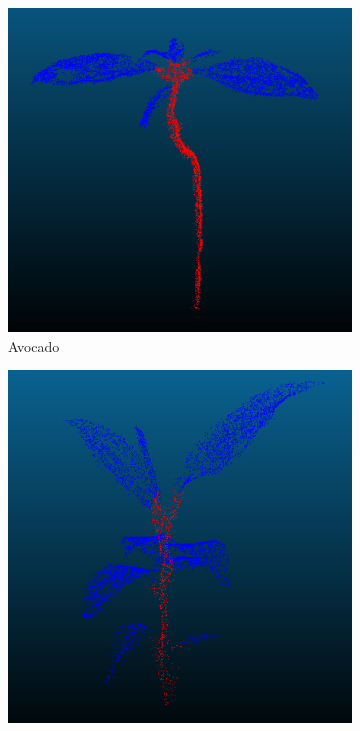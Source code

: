 \documentclass[12pt,titlepage, twoside]{article}
\begin{document}
\begin{figure}[htb]
    \centering 
\begin{subfigure}{0.24\textwidth}
  \includegraphics[width=\linewidth]{./Images/Plant_Avocado.png}
  \caption{Avocado}
  \label{fig:segmentation:compare:1}
\end{subfigure}\hfil
\begin{subfigure}{0.24\textwidth}
  \includegraphics[width=\linewidth]{./Images/Plant_Banana.png}

\end{subfigure}
\end{figure}
\end{document}
